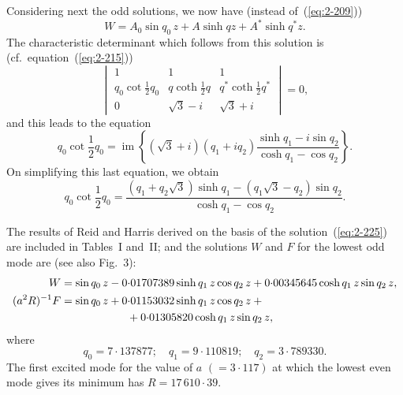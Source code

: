 Considering next the odd solutions, we now have (instead of~(\ref{eq:2-209}))
\begin{equation}
\label{eq:2-222}
W = A_0\sin q_0\,z + A\sinh qz + A^*\sinh q^*z.
\end{equation}
The characteristic determinant which follows from this solution is
(cf.\ equation~(\ref{eq:2-215}))
\begin{equation}
\label{eq:2-223}
\begin{vmatrix}
1 & 1 & 1 \\
q_0\cot\frac{1}{2}q_0 & q\coth\frac{1}{2}q & q^*\coth\frac{1}{2}q^* \\
0 & \sqrt{3}-i & \sqrt{3}+i
\end{vmatrix} = 0,
\end{equation}
and this leads to the equation
\begin{equation}
\label{eq:2-224}
q_0\cot\frac{1}{2}q_0 = \operatorname{im}\!\left\{(\sqrt{3}+i)(q_1+iq_2)\frac{\sinh q_1-i\sin q_2}{\cosh q_1-\cos q_2}\right\}\!.
\end{equation}
On simplifying this last equation, we obtain
\begin{equation}
\label{eq:2-225}
q_0\cot\frac{1}{2}q_0 = \frac{(q_1+q_2\sqrt{3})\sinh q_1-(q_1\sqrt{3}-q_2)\sin q_2}{\cosh q_1-\cos q_2}.
\end{equation}

The results of Reid and Harris derived on the basis of the solution~(\ref{eq:2-225}) are included in Tables~I and~II; and the solutions $W$ and $F$ for
the lowest odd mode are (see also Fig.~3):
\begin{align}
\label{eq:2-226}
W &= \sin q_0\,z - 0{\cdot}01707389\sinh q_1\,z\cos q_2\,z + 0{\cdot}00345645\cosh q_1\,z\sin q_2\,z, \notag\\
(a^2R)^{-1}F &= \sin q_0\,z + 0{\cdot}01153032\sinh q_1\,z\cos q_2\,z + {} \notag\\
&\qquad\qquad\qquad{} + 0{\cdot}01305820\cosh q_1\,z\sin q_2\,z,
\end{align}
where
\begin{equation}
\label{eq:2-227}
q_0 = 7{\cdot}137877; \quad q_1 = 9{\cdot}110819; \quad q_2 = 3{\cdot}789330.
\end{equation}
The first excited mode for the value of $a$ $(= 3{\cdot}117)$ at which the lowest
even mode gives its minimum has $R = 17\,610{\cdot}39$.

